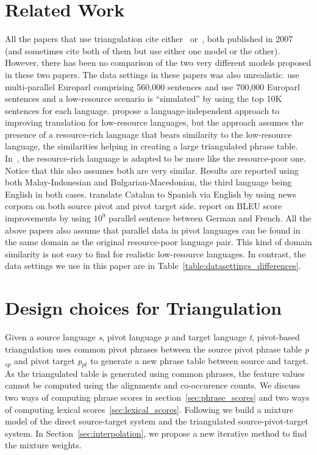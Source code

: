 \documentclass[11pt]{article}
\begin{document}
\section{Related Work}
	All the papers that use triangulation cite either~\cite{Utiyama:07} or~\cite{Cohn:07}, both published in 2007 (and sometimes cite both of them but use either one model or the other). However, there has been no comparison of the two very different models proposed in these two papers. The data settings in these papers was also unrealistic. \cite{Utiyama:07} use multi-parallel Europarl comprising 560,000 sentences and \cite{Cohn:07} use 700,000 Europarl sentences and a low-resource scenario is ``simulated'' by using the top 10K sentences for each language. \cite{Nakov:12} propose a language-independent approach to improving translation for low-resource languages, but the approach assumes the presence of a resource-rich language that bears similarity to the low-resource language, the similarities helping in creating a large triangulated phrase table. In~\cite{Nakovemnlp:12}, the resource-rich language is adapted to be more like the resource-poor one. Notice that this also assumes both are very similar. Results are reported using both Malay-Indonesian and Bulgarian-Macedonian, the third language being English in both cases. \cite{Gispert:06} translate Catalan to Spanish via English by using news corpora on both source pivot and pivot target side. \cite{Huck:12} report on BLEU score improvements by using $10^9$ parallel sentence between German and French. All the above papers also assume that parallel data in pivot languages can be found in the same domain as the original resource-poor language pair. This kind of domain similarity is not easy to find for realistic low-resource languages. In contrast, the data settings we use in this paper are in Table~\ref{table:datasettings_differences}. 

\section{Design choices for Triangulation}
\label{sec:models}
	
	Given a source language \emph{s}, pivot language \emph{p} and target language \emph{t}, pivot-based triangulation uses common pivot phrases between the source pivot phrase table \emph{p$_{sp}$} and pivot target \emph{p$_{pt}$} to generate a new phrase table between source and target. As the triangulated table is generated using common phrases, the feature values cannot be computed using the alignments and co-occurence counts. We discuss two ways of computing phrase scores in section~\ref{sec:phrase_scores} and two ways of computing lexical scores~\ref{sec:lexical_scores}. Following \cite{Cohn:07} we build a mixture model of the direct source-target system and the triangulated source-pivot-target system. In Section~\ref{sec:interpolation}, we propose a new iterative method to find the mixture weights.
\end{document}
